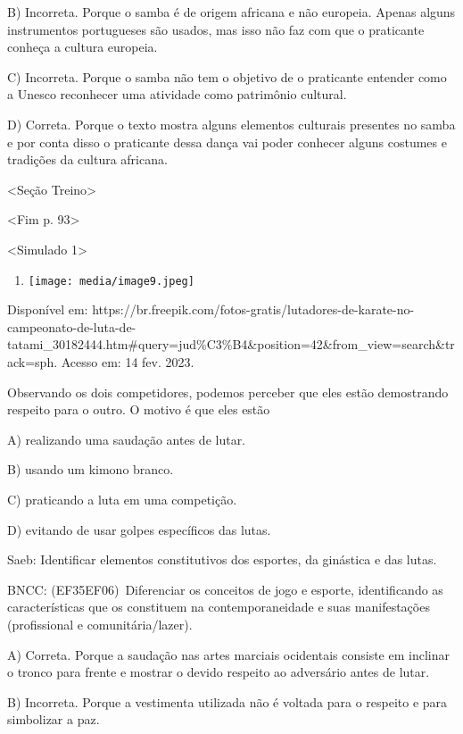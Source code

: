 B) Incorreta. Porque o samba é de origem africana e não europeia. Apenas
alguns instrumentos portugueses são usados, mas isso não faz com que o
praticante conheça a cultura europeia.

C) Incorreta. Porque o samba não tem o objetivo de o praticante entender
como a Unesco reconhecer uma atividade como patrimônio cultural.

D) Correta. Porque o texto mostra alguns elementos culturais presentes
no samba e por conta disso o praticante dessa dança vai poder conhecer
alguns costumes e tradições da cultura africana.

\textless{}Seção Treino\textgreater{}

\textless{}Fim p. 93\textgreater{}

\textless{}Simulado 1\textgreater{}

\begin{enumerate}
\def\labelenumi{\arabic{enumi}.}
\item
  \texttt{[image: media/image9.jpeg]}
\end{enumerate}

Disponível em:
https://br.freepik.com/fotos-gratis/lutadores-de-karate-no-campeonato-de-luta-de-tatami\_30182444.htm\#query=jud\%C3\%B4\&position=42\&from\_view=search\&track=sph.
Acesso em: 14 fev. 2023.

Observando os dois competidores, podemos perceber que eles estão
demostrando respeito para o outro. O motivo é que eles estão

A) realizando uma saudação antes de lutar.

B) usando um kimono branco.

C) praticando a luta em uma competição.

D) evitando de usar golpes específicos das lutas.

Saeb: Identificar elementos constitutivos dos esportes, da ginástica e
das lutas.

BNCC: (EF35EF06)~Diferenciar os conceitos de jogo e esporte,
identificando as características que os constituem na contemporaneidade
e suas manifestações (profissional e comunitária/lazer).

A) Correta. Porque a saudação nas artes marciais ocidentais consiste em
inclinar o tronco para frente e mostrar o devido respeito ao adversário
antes de lutar.

B) Incorreta. Porque a vestimenta utilizada não é voltada para o
respeito e para simbolizar a paz.

